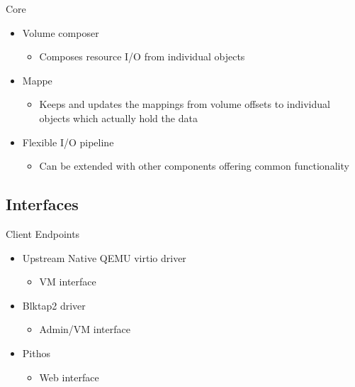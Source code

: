 \documentclass[utf8]{beamer}
\begin{document}
\begin{frame}{Core}

  \begin{itemize}
    \item Volume composer
      \begin{itemize}
      \item Composes resource I/O from individual objects
      \end{itemize}
    \item Mappe
      \begin{itemize}
      \item Keeps and updates the mappings from volume offsets to
        individual objects which actually hold the data 
      \end{itemize}
    \item Flexible I/O pipeline
      \begin{itemize}
      \item Can be extended with other components offering common
        functionality 
      \end{itemize}   
  \end{itemize}
  
\end{frame}

\subsection{Interfaces}

\begin{frame}{Client Endpoints}

  \begin{itemize}
  \item Upstream Native QEMU virtio driver
    \begin{itemize}
    \item VM interface
    \end{itemize}
  \item Blktap2 driver
    \begin{itemize}
    \item Admin/VM interface
    \end{itemize}
  \item Pithos
    \begin{itemize}
    \item Web interface
    \end{itemize}
  \end{itemize}
  
\end{frame}
\end{document}
